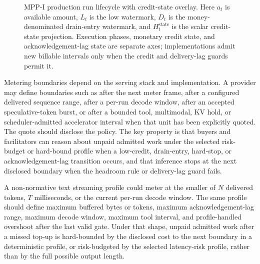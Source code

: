 \documentclass[11pt]{article}
\newcommand{\mppi}{MPP-I}
\begin{document}
\begin{figure}[H]
{%
}
\caption{\mppi{} production run lifecycle with credit-state overlay. Here \(a_t\) is available amount, \(L_t\) is the low watermark, \(D_t\) is the money-denominated drain-entry watermark, and \(H_t^{\mathrm{state}}\) is the scalar credit-state projection. Execution phases, monetary credit state, and acknowledgement-lag state are separate axes; implementations admit new billable intervals only when the credit and delivery-lag guards permit it.}
\label{fig:mppi-state-machine}
\end{figure}

Metering boundaries depend on the serving stack and implementation. A provider may define boundaries such as after the next meter frame, after a configured delivered sequence range, after a per-run decode window, after an accepted speculative-token burst, or after a bounded tool, multimodal, KV hold, or scheduler-admitted accelerator interval when that unit has been explicitly quoted. The quote should disclose the policy. The key property is that buyers and facilitators can reason about unpaid admitted work under the selected risk-budget or hard-bound profile when a low-credit, drain-entry, hard-stop, or acknowledgement-lag transition occurs, and that inference stops at the next disclosed boundary when the headroom rule or delivery-lag guard fails.

A non-normative text streaming profile could meter at the smaller of \(N\) delivered tokens, \(T\) milliseconds, or the current per-run decode window. The same profile should define maximum buffered bytes or tokens, maximum acknowledgement-lag range, maximum decode window, maximum tool interval, and profile-handled overshoot after the last valid gate. Under that shape, unpaid admitted work after a missed top-up is hard-bounded by the disclosed cost to the next boundary in a deterministic profile, or risk-budgeted by the selected latency-risk profile, rather than by the full possible output length.
\end{document}
